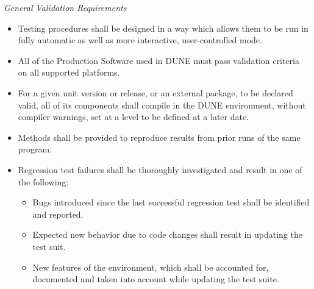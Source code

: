 \textit{General Validation Requirements}
\begin{itemize}
\item Testing procedures shall be designed in a way which allows them to be run in fully automatic as well as more interactive, user-controlled mode.

\item All of the Production Software used in DUNE must pass validation criteria on all supported platforms.

\item For a given unit version or release, or an external package, to be declared valid, all of its components shall compile in the DUNE environment, without compiler warnings, set at a level to be defined at a later date.



\item Methods shall be provided to reproduce results from prior runs of the same program.


\item Regression test failures shall be thoroughly investigated and result in one of the following:
\begin{itemize}
\item Bugs introduced since the last successful regression test shall be identified and reported.

\item Expected new behavior due to code changes shall result in updating the test suit.

\item New features of the environment, which shall be accounted for, documented and taken into account while updating the test suite.
\end{itemize}


\end{itemize}
